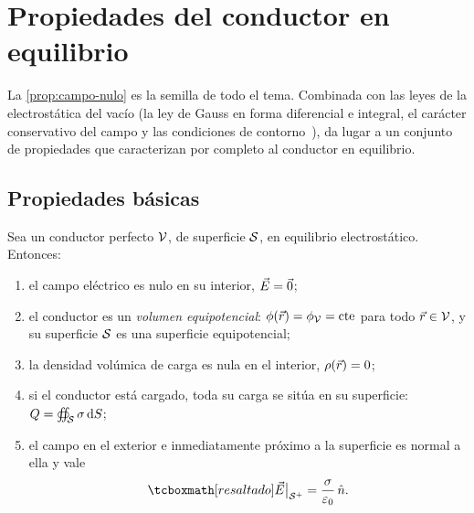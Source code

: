 \section{Propiedades del conductor en equilibrio}\label{sec:propiedades}
La \cref{prop:campo-nulo} es la semilla de todo el tema. Combinada con las leyes de la electrostática del vacío (la ley de Gauss en
forma diferencial e integral, el carácter conservativo del campo y las condiciones de contorno~\cite{TEMA1}), da lugar a un conjunto de
propiedades que caracterizan por completo al conductor en equilibrio.

\subsection{Propiedades básicas}\label{sec:basicas}
\begin{teorema}\label{teo:propiedades}
Sea un conductor perfecto $\mathcal{V}$, de superficie $\mathcal{S}$, en equilibrio electrostático. Entonces:
\begin{enumerate}[label=\textup{(\roman*)}]
  \item\label{it:p1} el campo eléctrico es nulo en su interior, $\vec{E}=\vec{0}$;
  \item\label{it:p2} el conductor es un \emph{volumen equipotencial}: $\phi(\vec{r})=\phi_{\mathcal{V}}=\mathrm{cte}$ para todo $\vec{r}\in\mathcal{V}$, y su
        superficie $\mathcal{S}$ es una superficie equipotencial;
  \item\label{it:p3} la densidad volúmica de carga es nula en el interior, $\rho(\vec{r})=0$;
  \item\label{it:p4} si el conductor está cargado, toda su carga se sitúa en su superficie: $Q=\oiint_{\mathcal{S}}\sigma\,\mathrm{d} S$;
  \item\label{it:p5} el campo en el exterior e inmediatamente próximo a la superficie es normal a ella y vale
        \begin{equation}\label{eq:campo-superficie}
          \resalta{\vE\big|_{\Sc^{+}}=\frac{\sigma}{\eo}\,\un .}
        \end{equation}
\end{enumerate}
\end{teorema}
